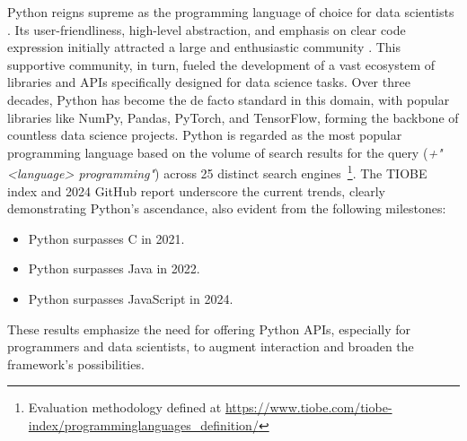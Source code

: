 Python reigns supreme as the programming language of choice for data scientists \cite{Python_CS-R9526}. Its user-friendliness, high-level abstraction, and emphasis on clear code expression initially attracted a large and enthusiastic community \cite{StackOverflowDeveloper}. This supportive community, in turn, fueled the development of a vast ecosystem of libraries and \glspl{API} specifically designed for data science tasks. Over three decades, Python has become the de facto standard in this domain, with popular libraries like NumPy, Pandas, PyTorch, and TensorFlow, forming the backbone of countless data science projects. Python is regarded as the most popular programming language based on the volume of search results for the query (\textit{+"<language> programming"}) across 25 distinct search engines~\footnote{Evaluation methodology defined at \url{https://www.tiobe.com/tiobe-index/programminglanguages_definition/}}. The TIOBE index \cite{TIOBEIndex} and 2024 GitHub report \cite{PythonTopLanguage} underscore the current trends, clearly demonstrating Python's ascendance, also evident from the following milestones:
\begin{itemize}
    \item Python surpasses C in 2021.
    \item Python surpasses Java in 2022.
    \item Python surpasses JavaScript in 2024.
\end{itemize}
These results emphasize the need for offering Python \glspl{API}, especially for programmers and data scientists, to augment interaction and broaden the framework's possibilities.
